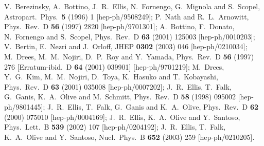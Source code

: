 \documentclass[final,3p,11pt,pdflatex]{elsarticle}
\begin{document}
\begin{thebibliography}{100}
  V.~Berezinsky, A.~Bottino, J.~R.~Ellis, N.~Fornengo, G.~Mignola and S.~Scopel,
  Astropart.\ Phys.\  {\bf 5} (1996) 1
  [hep-ph/9508249];
  P.~Nath and R.~L.~Arnowitt,
  Phys.\ Rev.\ D {\bf 56} (1997) 2820
  [hep-ph/9701301];
  A.~Bottino, F.~Donato, N.~Fornengo and S.~Scopel,
  Phys.\ Rev.\ D {\bf 63} (2001) 125003
  [hep-ph/0010203];
  V.~Bertin, E.~Nezri and J.~Orloff,
  JHEP {\bf 0302} (2003) 046
  [hep-ph/0210034];
%
  M.~Drees, M.~M.~Nojiri, D.~P.~Roy and Y.~Yamada,
  Phys.\ Rev.\ D {\bf 56} (1997) 276
   [Erratum-ibid.\ D {\bf 64} (2001) 039901]
  [hep-ph/9701219];
  M.~Drees, Y.~G.~Kim, M.~M.~Nojiri, D.~Toya, K.~Hasuko and T.~Kobayashi,
  Phys.\ Rev.\ D {\bf 63} (2001) 035008
  [hep-ph/0007202];
%
  J.~R.~Ellis, T.~Falk, G.~Ganis, K.~A.~Olive and M.~Schmitt,
  Phys.\ Rev.\ D {\bf 58} (1998) 095002
  [hep-ph/9801445];
  J.~R.~Ellis, T.~Falk, G.~Ganis and K.~A.~Olive,
  Phys.\ Rev.\ D {\bf 62} (2000) 075010
  [hep-ph/0004169];
%
  J.~R.~Ellis, K.~A.~Olive and Y.~Santoso,
  Phys.\ Lett.\ B {\bf 539} (2002) 107
  [hep-ph/0204192];
  J.~R.~Ellis, T.~Falk, K.~A.~Olive and Y.~Santoso,
  Nucl.\ Phys.\ B {\bf 652} (2003) 259
  [hep-ph/0210205].


\end{thebibliography}
\end{document}
